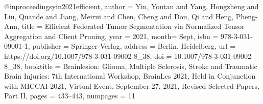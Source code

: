 @inproceedings{yin2021efficient,
author = {Yin, Youtan and Yang, Hongzheng and Liu, Quande and Jiang, Meirui and Chen, Cheng and Dou, Qi and Heng, Pheng-Ann},
title = {Efficient Federated Tumor Segmentation via Normalized Tensor Aggregation and Client Pruning},
year = {2021},
month= {Sept},
isbn = {978-3-031-09001-1},
publisher = {Springer-Verlag},
address = {Berlin, Heidelberg},
url = {https://doi.org/10.1007/978-3-031-09002-8_38},
doi = {10.1007/978-3-031-09002-8_38},
booktitle = {Brainlesion: Glioma, Multiple Sclerosis, Stroke and Traumatic Brain Injuries: 7th International Workshop, BrainLes 2021, Held in Conjunction with MICCAI 2021, Virtual Event, September 27, 2021, Revised Selected Papers, Part II},
pages = {433–443},
numpages = {11}
}